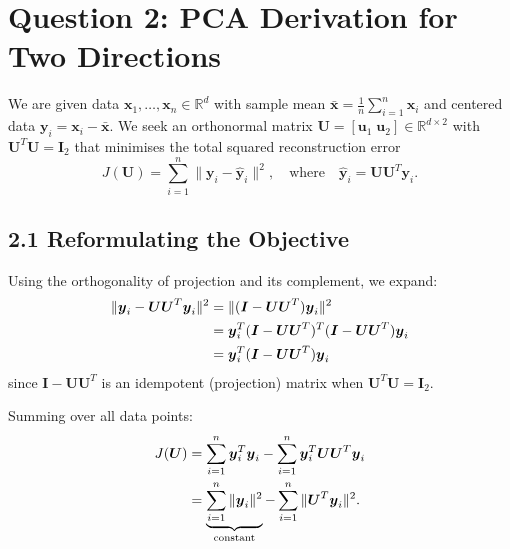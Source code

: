 \documentclass[11pt]{article}
\begin{document}
\newpage
\section*{Question 2: PCA Derivation for Two Directions}

We are given data $\boldsymbol{x}_1,\dots,\boldsymbol{x}_n \in \mathbb{R}^d$ with sample mean
$\bar{\boldsymbol{x}} = \frac{1}{n}\sum_{i=1}^n \boldsymbol{x}_i$ and centered data
$\boldsymbol{y}_i = \boldsymbol{x}_i - \bar{\boldsymbol{x}}$.
We seek an orthonormal matrix $\boldsymbol{U} = [\boldsymbol{u}_1\;\boldsymbol{u}_2] \in \mathbb{R}^{d \times 2}$
with $\boldsymbol{U}^T\boldsymbol{U} = \boldsymbol{I}_2$ that minimises the total squared
reconstruction error
\[
J(\boldsymbol{U})
= \sum_{i=1}^n \|\boldsymbol{y}_i - \hat{\boldsymbol{y}}_i\|^2,
\quad\text{where}\quad
\hat{\boldsymbol{y}}_i = \boldsymbol{U}\boldsymbol{U}^T\boldsymbol{y}_i.
\]

\subsection*{2.1 Reformulating the Objective}

Using the orthogonality of projection and its complement, we expand:
\begin{align}
\|\boldsymbol{y}_i - \boldsymbol{U}\boldsymbol{U}^T\boldsymbol{y}_i\|^2
&= \|(\boldsymbol{I} - \boldsymbol{U}\boldsymbol{U}^T)\boldsymbol{y}_i\|^2 \notag\\
&= \boldsymbol{y}_i^T(\boldsymbol{I} - \boldsymbol{U}\boldsymbol{U}^T)^T
   (\boldsymbol{I} - \boldsymbol{U}\boldsymbol{U}^T)\boldsymbol{y}_i \notag\\
&= \boldsymbol{y}_i^T(\boldsymbol{I} - \boldsymbol{U}\boldsymbol{U}^T)\boldsymbol{y}_i
\label{eq:idempotent}
\end{align}
since $\boldsymbol{I} - \boldsymbol{U}\boldsymbol{U}^T$ is an idempotent (projection) matrix
when $\boldsymbol{U}^T\boldsymbol{U} = \boldsymbol{I}_2$.

Summing over all data points:
\begin{align}
J(\boldsymbol{U})
&= \sum_{i=1}^n \boldsymbol{y}_i^T\boldsymbol{y}_i
 - \sum_{i=1}^n \boldsymbol{y}_i^T \boldsymbol{U}\boldsymbol{U}^T\boldsymbol{y}_i \notag\\
&= \underbrace{\sum_{i=1}^n \|\boldsymbol{y}_i\|^2}_{\text{constant}}
 - \sum_{i=1}^n \|\boldsymbol{U}^T\boldsymbol{y}_i\|^2.
\end{align}
\end{document}
